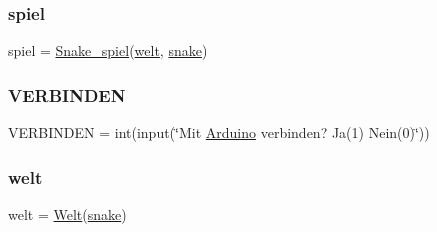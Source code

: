 \subsubsection{\texorpdfstring{spiel}{spiel}}
{\footnotesize\ttfamily spiel = \mbox{\hyperlink{class_snake_01_projekt_01auf_01_python_1_1_snake__spiel}{Snake\+\_\+spiel}}(\mbox{\hyperlink{namespace_snake_01_projekt_01auf_01_python_a80417409ca56d97eabc593c02dbb4a1c}{welt}}, \mbox{\hyperlink{namespace_snake_01_projekt_01auf_01_python_aa798779259654cac04213978cf4297ab}{snake}})}

\mbox{\label{namespace_snake_01_projekt_01auf_01_python_a494a6a834239a0d8becd8a87a00ec956}} 
\subsubsection{\texorpdfstring{V\+E\+R\+B\+I\+N\+D\+EN}{VERBINDEN}}
{\footnotesize\ttfamily V\+E\+R\+B\+I\+N\+D\+EN = int(input(\char`\"{}Mit \mbox{\hyperlink{class_snake_01_projekt_01auf_01_python_1_1_arduino}{Arduino}} verbinden? Ja(1) Nein(0)\char`\"{}))}

\mbox{\label{namespace_snake_01_projekt_01auf_01_python_a80417409ca56d97eabc593c02dbb4a1c}} 
\subsubsection{\texorpdfstring{welt}{welt}}
{\footnotesize\ttfamily welt = \mbox{\hyperlink{class_snake_01_projekt_01auf_01_python_1_1_welt}{Welt}}(\mbox{\hyperlink{namespace_snake_01_projekt_01auf_01_python_aa798779259654cac04213978cf4297ab}{snake}})}

\mbox{\label{namespace_snake_01_projekt_01auf_01_python_a0bb194ef42a009e15b75b9c78234ec82}} 
